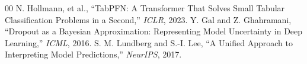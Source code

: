 \documentclass[conference]{IEEEtran}
\begin{document}
\begin{thebibliography}{00}
 N. Hollmann, et al., ``TabPFN: A Transformer That Solves Small Tabular Classification Problems in a Second,'' \textit{ICLR}, 2023.
 Y. Gal and Z. Ghahramani, ``Dropout as a Bayesian Approximation: Representing Model Uncertainty in Deep Learning,'' \textit{ICML}, 2016.
 S. M. Lundberg and S.-I. Lee, ``A Unified Approach to Interpreting Model Predictions,'' \textit{NeurIPS}, 2017.
\end{thebibliography}
\end{document}
